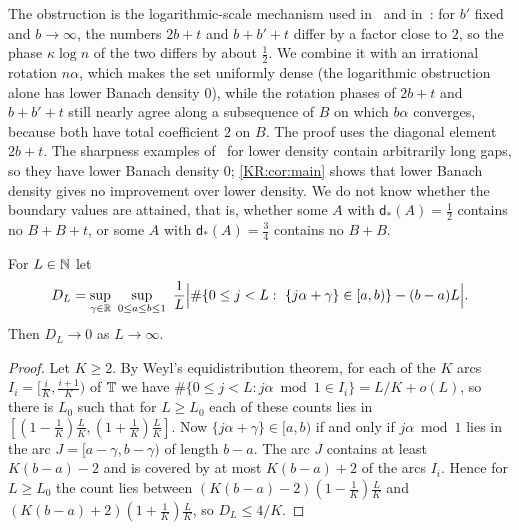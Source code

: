 \begin{remark}\label{KR:rem:credit}
The obstruction is the logarithmic-scale mechanism used in~\cite[Example~3.6]{kra2023problems} and
in~\cite[Proposition~5.1]{kousek2024infinite}: for $b'$ fixed and $b\to\infty$, the numbers $2b+t$ and
$b+b'+t$ differ by a factor close to $2$, so the phase $\kappa\log n$ of the two differs by about
$\frac12$. We combine it with an irrational rotation $n\alpha$, which makes the set uniformly dense
(the logarithmic obstruction alone has lower Banach density $0$), while the rotation phases of $2b+t$ and
$b+b'+t$ still nearly agree along a subsequence of $B$ on which $b\alpha$ converges, because both have
total coefficient $2$ on $B$. The proof uses the diagonal element $2b+t$. The sharpness examples
of~\cite[Proposition~4.2]{kousek2024infinite} for lower density contain arbitrarily long gaps, so they
have lower Banach density $0$; \cref{KR:cor:main} shows that lower Banach density gives no improvement
over lower density. We do not know whether the boundary values are attained, that is, whether some
$A$ with $\mathsf d_*(A)=\frac12$ contains no $B+B+t$, or some $A$ with $\mathsf d_*(A)=\frac34$ contains
no $B+B$.
\end{remark}

\begin{lemma}\label{KR:lem:rot}
For $L\in\mathbb{N}$ let
\[
D_L=\sup_{\gamma\in\R}\ \sup_{0\le a\le b\le1}\ \frac1L\Big|\#\{0\le j<L:\ \{j\alpha+\gamma\}\in[a,b)\}-(b-a)L\Big| .
\]
Then $D_L\to0$ as $L\to\infty$.
\end{lemma}

\begin{proof}
Let $K\ge2$. By Weyl's equidistribution theorem, for each of the $K$ arcs $I_i=[\frac iK,\frac{i+1}K)$
of $\mathbb{T}$ we have $\#\{0\le j<L:j\alpha\bmod1\in I_i\}=L/K+o(L)$, so there is $L_0$ such that for $L\ge
L_0$ each of these counts lies in $[(1-\frac1K)\frac LK,(1+\frac1K)\frac LK]$. Now $\{j\alpha+\gamma\}\in
[a,b)$ if and only if $j\alpha\bmod1$ lies in the arc $J=[a-\gamma,b-\gamma)$ of length $b-a$. The arc
$J$ contains at least $K(b-a)-2$ and is covered by at most $K(b-a)+2$ of the arcs $I_i$. Hence for
$L\ge L_0$ the count lies between $(K(b-a)-2)(1-\frac1K)\frac LK$ and $(K(b-a)+2)(1+\frac1K)\frac LK$,
so $D_L\le 4/K$.
\end{proof}

